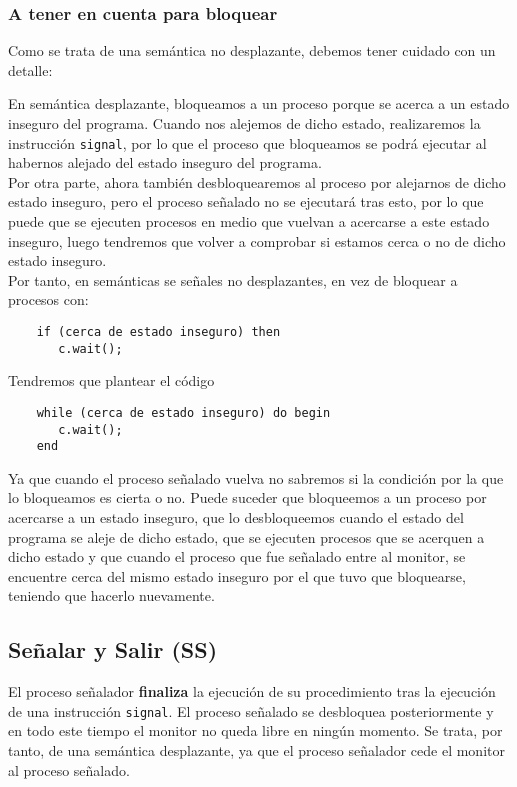 \subsubsection{A tener en cuenta para bloquear}
Como se trata de una semántica no desplazante, debemos tener cuidado con un detalle:

En semántica desplazante, bloqueamos a un proceso porque se acerca a un estado inseguro del programa. Cuando nos alejemos de dicho estado, realizaremos la instrucción \verb|signal|, por lo que el proceso que bloqueamos se podrá ejecutar al habernos alejado del estado inseguro del programa.\\

Por otra parte, ahora también desbloquearemos al proceso por alejarnos de dicho estado inseguro, pero el proceso señalado no se ejecutará tras esto, por lo que puede que se ejecuten procesos en medio que vuelvan a acercarse a este estado inseguro, luego tendremos que volver a comprobar si estamos cerca o no de dicho estado inseguro.\\

\noindent
Por tanto, en semánticas se señales no desplazantes, en vez de bloquear a procesos con:
\begin{verbatim}
    if (cerca de estado inseguro) then
       c.wait();
\end{verbatim}
Tendremos que plantear el código
\begin{verbatim}
    while (cerca de estado inseguro) do begin
       c.wait();
    end
\end{verbatim}
Ya que cuando el proceso señalado vuelva no sabremos si la condición por la que lo bloqueamos es cierta o no. Puede suceder que bloqueemos a un proceso por acercarse a un estado inseguro, que lo desbloqueemos cuando el estado del programa se aleje de dicho estado, que se ejecuten procesos que se acerquen a dicho estado y que cuando el proceso que fue señalado entre al monitor, se encuentre cerca del mismo estado inseguro por el que tuvo que bloquearse, teniendo que hacerlo nuevamente.

\subsection{Señalar y Salir (SS)}
El proceso señalador \textbf{finaliza} la ejecución de su procedimiento tras la ejecución de una instrucción \verb|signal|. El proceso señalado se desbloquea posteriormente y en todo este tiempo el monitor no queda libre en ningún momento. Se trata, por tanto, de una semántica desplazante, ya que el proceso señalador cede el monitor al proceso señalado.\\

